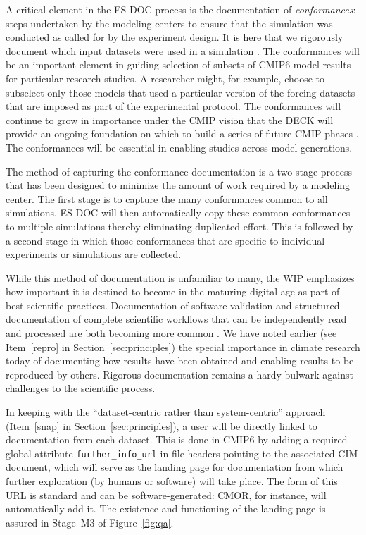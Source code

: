 \documentclass[gmd,manuscript]{copernicus}
\newcommand{\pllabel}[1]{\label{p-#1}\linelabel{l-#1}}
\begin{document}
A critical element in the ES-DOC process is the documentation of
\emph{conformances}: steps undertaken by the modeling centers to
ensure that the simulation was conducted as called for by the
experiment design. It is here that we rigorously document which input
datasets were used in a simulation \citep[e.g., the version of each of
the forcing datasets, see][]{ref:duracketal2017}. The conformances
will be an important element in guiding selection of subsets of CMIP6
model results for particular research studies. A researcher might, for
example, choose to subselect only those models that used a particular
version of the forcing datasets that are imposed as part of the
experimental protocol. The conformances will continue to grow in
importance under the CMIP vision that the DECK will provide an ongoing
foundation on which to build a series of future CMIP phases
\citep[shown schematically in Figure~1 of][]{ref:eyringetal2016a}. The
conformances will be essential in enabling studies across model
generations.

The method of capturing the conformance documentation is a two-stage
process that has been designed to minimize the amount of work required
by a modeling center. The first stage is to capture the many
conformances common to all simulations. ES-DOC will then automatically
copy these common conformances to multiple simulations thereby
eliminating duplicated effort. This is followed by a second stage in
which those conformances that are specific to individual experiments
or simulations are collected.

While this method of documentation is unfamiliar to many, the WIP
emphasizes how important it is destined to become in the maturing
digital age as part of best scientific practices. Documentation of
software validation \citep[see e.g][]{ref:peng2011} and structured
documentation of complete scientific workflows that can be
independently read and processed are both becoming more common
\citep[see the special issue on the ``Geoscience Paper of the
Future'', ][]{ref:davidetal2016}. We have noted earlier
\pllabel{RC2-32}
(see Item~\ref{repro} in Section~\ref{sec:principles}) the special
importance in climate research today of documenting how results have
been obtained and enabling results to be reproduced by others.
Rigorous documentation remains a hardy bulwark against challenges to
the scientific process.

In keeping with the ``dataset-centric rather than system-centric''
approach (Item~\ref{snap} in Section~\ref{sec:principles}), a user
will be directly linked to documentation from each dataset. This is
done in CMIP6 by \pllabel{RC1-55} adding a required global attribute
\texttt{further\_info\_url} in file headers pointing to the associated
CIM document, which will serve as the landing page for documentation
from which further exploration (by humans or software) will take
place. The form of this URL is standard and can be software-generated:
CMOR, for instance, will automatically add it. The existence and
functioning of the landing page is assured in Stage~M3 of
Figure~\ref{fig:qa}.
\end{document}
